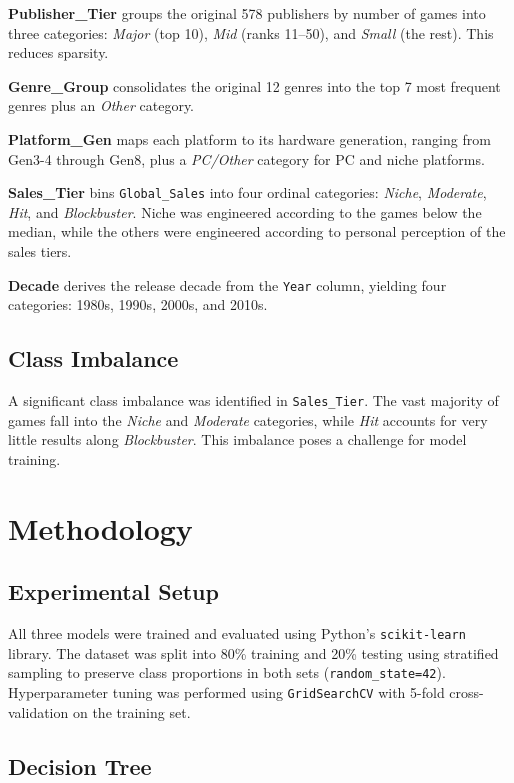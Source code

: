 \documentclass[sigconf]{acmart}
\begin{document}
\textbf{Publisher\_Tier} groups the original 578 publishers by number of games into three categories: \textit{Major} (top 10),
\textit{Mid} (ranks 11--50), and \textit{Small} (the rest). This reduces sparsity.

\textbf{Genre\_Group} consolidates the original 12 genres into the top 7 most frequent genres plus an \textit{Other} category.

\textbf{Platform\_Gen} maps each platform to its hardware generation, ranging from Gen3-4 through Gen8, plus a \textit{PC/Other} category for PC and niche platforms.

\textbf{Sales\_Tier} bins \texttt{Global\_Sales} into four ordinal categories: \textit{Niche}, \textit{Moderate},
\textit{Hit}, and \textit{Blockbuster}. Niche was engineered according to the games below the median, while the others were engineered according
to personal perception of the sales tiers.

\textbf{Decade} derives the release decade from the \texttt{Year} column, yielding four categories: 1980s, 1990s, 2000s, and 2010s.

\subsection{Class Imbalance}

A significant class imbalance was identified in \texttt{Sales\_Tier}.
The vast majority of games fall into the \textit{Niche} and \textit{Moderate} categories, while \textit{Hit}
accounts for very little results along \textit{Blockbuster}. This imbalance poses a challenge for model training.

\section{Methodology}

\subsection{Experimental Setup}

All three models were trained and evaluated using Python's \texttt{scikit-learn} library. The dataset was split into 80\%
training and 20\% testing using stratified sampling to preserve class proportions in both sets (\texttt{random\_state=42}). Hyperparameter
tuning was performed using \texttt{GridSearchCV} with 5-fold cross-validation on the training set.

\subsection{Decision Tree}
\end{document}
